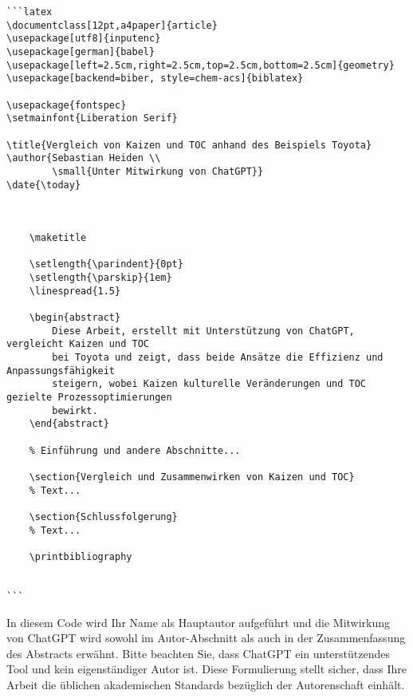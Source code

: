 \begin{verbatim}
```latex
\documentclass[12pt,a4paper]{article}
\usepackage[utf8]{inputenc}
\usepackage[german]{babel}
\usepackage[left=2.5cm,right=2.5cm,top=2.5cm,bottom=2.5cm]{geometry}
\usepackage[backend=biber, style=chem-acs]{biblatex}

\usepackage{fontspec}
\setmainfont{Liberation Serif}

\title{Vergleich von Kaizen und TOC anhand des Beispiels Toyota}
\author{Sebastian Heiden \\
	    \small{Unter Mitwirkung von ChatGPT}}
\date{\today}


	
	\maketitle
	
	\setlength{\parindent}{0pt}
	\setlength{\parskip}{1em}
	\linespread{1.5}
	
	\begin{abstract}
		Diese Arbeit, erstellt mit Unterstützung von ChatGPT, vergleicht Kaizen und TOC
		bei Toyota und zeigt, dass beide Ansätze die Effizienz und Anpassungsfähigkeit
		steigern, wobei Kaizen kulturelle Veränderungen und TOC gezielte Prozessoptimierungen
		bewirkt.
	\end{abstract}
	
	% Einführung und andere Abschnitte...
	
	\section{Vergleich und Zusammenwirken von Kaizen und TOC}
	% Text...
	
	\section{Schlussfolgerung}
	% Text...
	
	\printbibliography
	

```
\end{verbatim}

In diesem Code wird Ihr Name als Hauptautor aufgeführt und die Mitwirkung von ChatGPT wird sowohl im Autor-Abschnitt als auch in der Zusammenfassung des Abstracts erwähnt. Bitte beachten Sie, dass ChatGPT ein unterstützendes Tool und kein eigenständiger Autor ist. Diese Formulierung stellt sicher, dass Ihre Arbeit die üblichen akademischen Standards bezüglich der Autorenschaft einhält.

